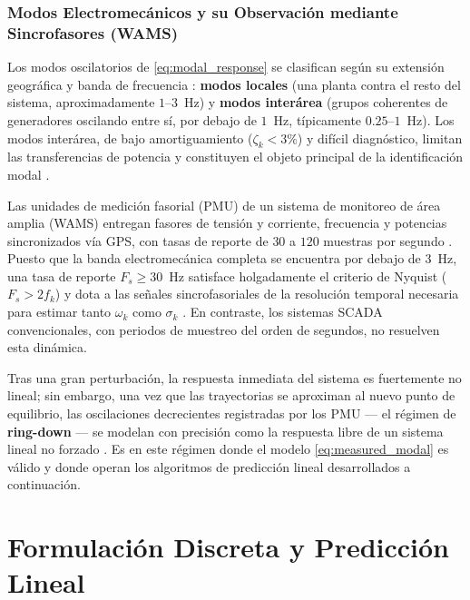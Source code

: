 
\subsubsection{Modos Electromecánicos y su Observación mediante
Sincrofasores (WAMS)}

Los modos oscilatorios de \eqref{eq:modal_response} se clasifican según su
extensión geográfica y banda de frecuencia \cite{kundur1994,sauer2017}:
\textbf{modos locales} (una planta contra el resto del sistema,
aproximadamente $1$--$3$~Hz) y \textbf{modos interárea} (grupos coherentes
de generadores oscilando entre sí, por debajo de $1$~Hz, típicamente
$0.25$--$1$~Hz). Los modos interárea, de bajo amortiguamiento
($\zeta_k < 3\%$) y difícil diagnóstico, limitan las transferencias de
potencia y constituyen el objeto principal de la identificación modal
\cite{sauer2017}.

Las unidades de medición fasorial (PMU) de un sistema de monitoreo de área
amplia (WAMS) entregan fasores de tensión y corriente, frecuencia y
potencias sincronizados vía GPS, con tasas de reporte de $30$ a $120$
muestras por segundo \cite{sauer2017}. Puesto que la banda electromecánica
completa se encuentra por debajo de $3$~Hz, una tasa de reporte
$F_s \ge 30$~Hz satisface holgadamente el criterio de Nyquist
($F_s > 2 f_k$) y dota a las señales sincrofasoriales de la resolución
temporal necesaria para estimar tanto $\omega_k$ como $\sigma_k$
\cite{sauer2017}. En contraste, los sistemas SCADA convencionales, con
periodos de muestreo del orden de segundos, no resuelven esta dinámica.

Tras una gran perturbación, la respuesta inmediata del sistema es
fuertemente no lineal; sin embargo, una vez que las trayectorias se
aproximan al nuevo punto de equilibrio, las oscilaciones decrecientes
registradas por los PMU --- el régimen de \textbf{ring-down} --- se modelan
con precisión como la respuesta libre de un sistema lineal no forzado
\cite{sauer2017}. Es en este régimen donde el modelo
\eqref{eq:measured_modal} es válido y donde operan los algoritmos de
predicción lineal desarrollados a continuación.

\section{Formulación Discreta y Predicción Lineal}

